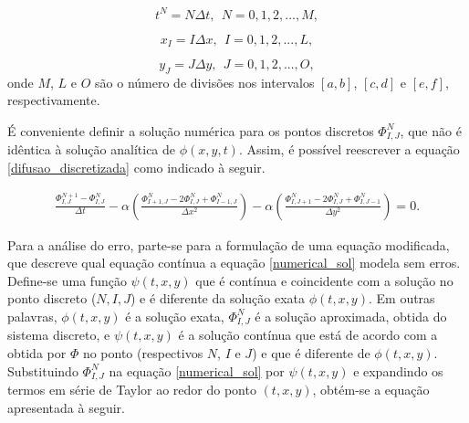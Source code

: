 \documentclass[10pt,twoside,a4paper]{article}
\begin{document}
	\vspace*{-3mm}
	
	\begin{equation} \label{discretizacao_tempo_espaco}
	t^{N} = N \Delta t, \ \ N=0,1,2,...,M,
	\end{equation}	
	
	\begin{equation}
	x_{I} = I \Delta x, \ \ I=0,1,2,...,L,
	\end{equation}
	
	\begin{equation}
	y_{J} = J \Delta y, \ \ J=0,1,2,...,O,
	\end{equation}
	onde $M$, $L$ e $O$ são o número de divisões nos intervalos $[a,b]$, $[c,d]$ e $[e,f]$, respectivamente.	
	
	É conveniente definir a solução numérica para os pontos discretos $\Phi_{I,J}^{N}$, que não é idêntica à solução analítica de $\phi (x,y,t)$. Assim, é possível reescrever a equação \ref{difusao_discretizada} como indicado à
	seguir.
	
	
	\begin{equation} \label{numerical_sol}
	\begin{split}
	\frac{\Phi_{I,J}^{N+1}-\Phi_{I,J}^{N} }{\Delta t} - \alpha \left( \frac{\Phi_{I+1,J}^{N} -2 \Phi_{I,J}^{N} + \Phi_{I-1,J}^{N}}{\Delta x^2} \right) -	\alpha \left( \frac{\Phi_{I,J+1}^{N}-2 \Phi_{I,J}^{N} + \Phi_{I,J-1}^{N}}{\Delta y^2} \right) = 0. %
	\end{split}
	\end{equation}
	
	Para a análise do erro, parte-se para a formulação de uma equação modificada, que descreve qual equação contínua a equação \ref{numerical_sol} modela sem erros. Define-se uma função $\psi(t,x,y)$ que é contínua e coincidente com a solução no ponto discreto ($N,I,J$) e é diferente da solução exata $\phi(t,x,y)$. Em outras palavras, $\phi(t,x,y)$ é a solução exata, $\Phi_{I,J}^{N}$ é a solução aproximada, obtida do sistema discreto, e $\psi(t,x,y)$ é a solução contínua que está de acordo com a obtida por $\Phi$ no ponto (respectivos $N$, $I$ e $J$) e que é diferente de $\phi(t,x,y)$. Substituindo $\Phi_{I,J}^{N}$ na equação \ref{numerical_sol} por $\psi(t,x,y)$ e expandindo os termos em série de Taylor ao redor do ponto $(t,x,y)$, obtém-se a equação apresentada à seguir.	
	
\end{document}
